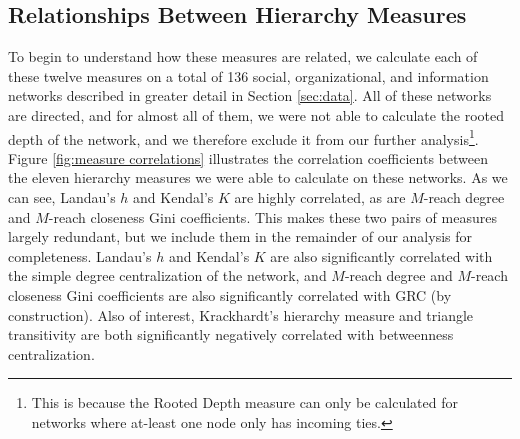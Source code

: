 \documentclass[3p,times]{elsarticle}
\begin{document}
\subsection{Relationships Between Hierarchy Measures}
To begin to understand how these measures are related, we calculate each of these twelve measures on a total of 136 social, organizational, and information networks described in greater detail in Section \ref{sec:data}. All of these networks are directed, and for almost all of them, we were not able to calculate the rooted depth of the network, and we therefore exclude it from our further analysis\footnote{This is because the Rooted Depth measure can only be calculated for networks where at-least one node only has incoming ties.}. Figure \ref{fig:measure correlations} illustrates the correlation coefficients between the eleven hierarchy measures we were able to calculate on these networks. As we can see,  Landau's $h$ and Kendal's $K$ are highly correlated, as are $M$-reach degree and $M$-reach closeness Gini coefficients. This makes these two pairs of measures largely redundant, but we include them in the remainder of our analysis for completeness. Landau's $h$ and Kendal's $K$ are also significantly correlated with the simple degree centralization of the network, and $M$-reach degree and $M$-reach closeness Gini coefficients are also significantly correlated with GRC (by construction). Also of interest, Krackhardt's hierarchy measure and triangle transitivity are both significantly negatively correlated with betweenness centralization.
\end{document}
